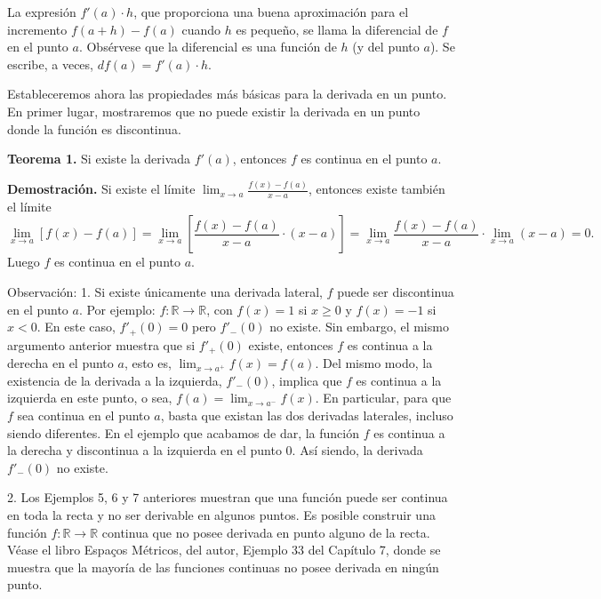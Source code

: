\documentclass[12pt,oneside]{book}
\begin{document}
La expresión \( f'(a) \cdot h \), que proporciona una buena aproximación para el incremento \( f(a + h) - f(a) \) cuando \( h \) es pequeño, se llama la diferencial de \( f \) en el punto \( a \). Obsérvese que la diferencial es una función de \( h \) (y del punto \( a \)). Se escribe, a veces, \( df(a) = f'(a) \cdot h \).

Estableceremos ahora las propiedades más básicas para la derivada en un punto. En primer lugar, mostraremos que no puede existir la derivada en un punto donde la función es discontinua.

\textbf{Teorema 1.} Si existe la derivada \( f'(a) \), entonces \( f \) es continua en el punto \( a \).

\textbf{Demostración.} Si existe el límite \( \lim_{x \to a} \frac{f(x) - f(a)}{x - a} \), entonces existe también el límite
\[
\lim_{x \to a} [f(x) - f(a)] =
\lim_{x \to a} \left[ \frac{f(x) - f(a)}{x - a} \cdot (x - a) \right] =
\lim_{x \to a} \frac{f(x) - f(a)}{x - a} \cdot \lim_{x \to a} (x - a) = 0.
\]
Luego \( f \) es continua en el punto \( a \).

Observación: 1. Si existe únicamente una derivada lateral, \( f \) puede ser discontinua en el punto \( a \). Por ejemplo: \( f: \mathbb{R} \to \mathbb{R} \), con \( f(x) = 1 \) si \( x \geq 0 \) y \( f(x) = -1 \) si \( x < 0 \). En este caso, \( f'_+(0) = 0 \) pero \( f'_-(0) \) no existe. Sin embargo, el mismo argumento anterior muestra que si \( f'_+(0) \) existe, entonces \( f \) es continua a la derecha en el punto \( a \), esto es, \( \lim_{x \to a^+} f(x) = f(a) \). Del mismo modo, la existencia de la derivada a la izquierda, \( f'_-(0) \), implica que \( f \) es continua a la izquierda en este punto, o sea, \( f(a) = \lim_{x \to a^-} f(x) \). En particular, para que \( f \) sea continua en el punto \( a \), basta que existan las dos derivadas laterales, incluso siendo diferentes. En el ejemplo que acabamos de dar, la función \( f \) es continua a la derecha y discontinua a la izquierda en el punto \( 0 \). Así siendo, la derivada \( f'_-(0) \) no existe.

2. Los Ejemplos 5, 6 y 7 anteriores muestran que una función puede ser continua en toda la recta y no ser derivable en algunos puntos. Es posible construir una función \( f: \mathbb{R} \to \mathbb{R} \) continua que no posee derivada en punto alguno de la recta. Véase el libro Espaços Métricos, del autor, Ejemplo 33 del Capítulo 7, donde se muestra que la mayoría de las funciones continuas no posee derivada en ningún punto.
\end{document}
